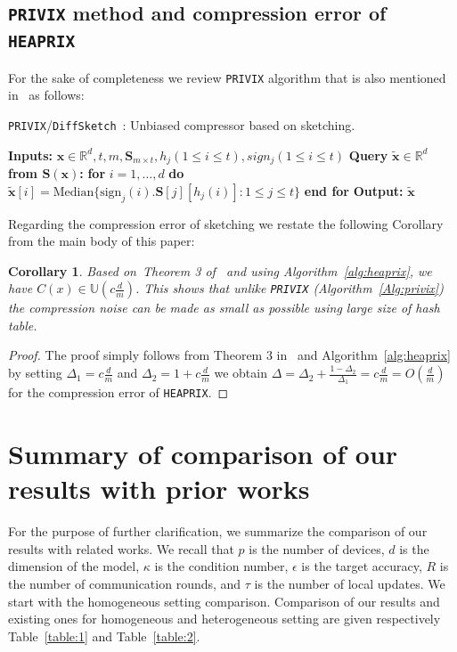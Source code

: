 \documentclass{article} %
\newtheorem{corollary}{Corollary}
\begin{document}
\subsection{\texttt{PRIVIX} method and compression error of \texttt{HEAPRIX}}
For the sake of completeness we review \texttt{PRIVIX} algorithm that is also mentioned in~\cite{li2019privacy} as follows:

\begin{algorithm}[H]
\caption{\texttt{PRIVIX}/\texttt{DiffSketch}~\citep{li2019privacy}: Unbiased compressor based on sketching. }\label{Alg:privix}
\begin{algorithmic}[1]
\STATE \textbf{Inputs:} $\boldsymbol{x}\in\mathbb{R}^{d}, t, m, \mathbf{S}_{m\times t}, h_j (1\leq i\leq t), sign_j (1\leq i\leq t)$
\STATE \textbf{Query} $\tilde{\boldsymbol{x}}\in\mathbb{R}^d$ \textbf{from $\mathbf{S(\boldsymbol{x})}$:}
\STATE \textbf{for} $i=1,\ldots,d$ \textbf{do}
\STATE \quad\quad ${\tilde{\boldsymbol{x}}}[i]=\text{Median}\{\text{sign}_j(i).\mathbf{S}[j][h_j(i)]:1\leq j\leq t\}$ 
\STATE \textbf{end for}
\STATE \textbf{Output:} ${\tilde{\boldsymbol{x}}}$
\end{algorithmic}
\end{algorithm}



Regarding the compression error of sketching we restate the following Corollary from the main body of this paper:
\begin{corollary}
Based on~Theorem 3 of~\citep{horvath2020better} and using Algorithm~\ref{alg:heaprix}, we have $C(x)\in \mathbb{U}(c \frac{d}{m})$. This shows that unlike \texttt{PRIVIX} (Algorithm~\ref{Alg:privix}) the compression noise can be made as small as possible using large size of hash table.
\end{corollary}

\begin{proof}
The proof simply follows from Theorem 3 in~\cite{horvath2020better} and Algorithm~\ref{alg:heaprix} by setting $\Delta_1=c\frac{d}{m}$ and $\Delta_2=1+c\frac{d}{m}$ we obtain $\Delta=\Delta_2+\frac{1-\Delta_2}{\Delta_1}=c\frac{d}{m}=O\left(\frac{d}{m}\right)$ for the compression error of \texttt{HEAPRIX}. 
\end{proof}

\clearpage

\section{Summary of comparison of our results with prior works}\label{app:comparison}
For the purpose of further clarification, we summarize the comparison of our results with related works. 
We recall that $p$ is the number of devices, $d$ is the dimension of the model, $\kappa$ is the condition number, $\epsilon$ is the target accuracy, $R$ is  the number of communication rounds, and $\tau$ is the number of local updates. 
We start with the homogeneous setting comparison.
Comparison of our results and existing ones for homogeneous and heterogeneous setting are given respectively Table~\ref{table:1} and Table~\ref{table:2}.
\end{document}

